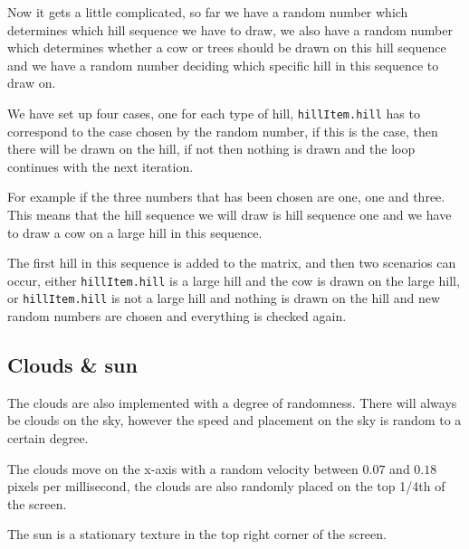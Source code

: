 Now it gets a little complicated, so far we have a random number which determines which hill sequence we have to draw, we also have a random number which determines whether a cow or trees should be drawn on this hill sequence and we have a random number deciding which specific hill in this sequence to draw on. 

We have set up four cases, one for each type of hill, \lstinline|hillItem.hill| has to correspond to the case chosen by the random number, if this is the case, then there will be drawn on the hill, if not then nothing is drawn and the loop continues with the next iteration.  

For example if the three numbers that has been chosen are one, one and three. This means that the hill sequence we will draw is hill sequence one and we have to draw a cow on a large hill in this sequence. 

The first hill in this sequence is added to the matrix, and then two scenarios can occur, either \lstinline|hillItem.hill| is a large hill and the cow is drawn on the large hill, or \lstinline|hillItem.hill| is not a large hill and nothing is drawn on the hill and new random numbers are chosen and everything is checked again.

\subsection{Clouds \& sun}

The clouds are also implemented with a degree of randomness. There will always be clouds on the sky, however the speed and placement on the sky is random to a certain degree. 

The clouds move on the x-axis with a random velocity between $0.07$ and $0.18$ pixels per millisecond, the clouds are also randomly placed on the top 1/4th of the screen. 

The sun is a stationary texture in the top right corner of the screen. 